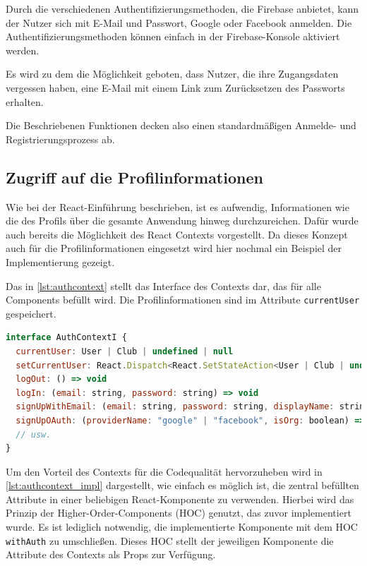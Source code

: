Durch die verschiedenen Authentifizierungsmethoden, die Firebase anbietet, kann der Nutzer sich mit E-Mail und Passwort, Google oder Facebook anmelden. Die Authentifizierungsmethoden können einfach in der Firebase-Konsole aktiviert werden.

Es wird zu dem die Möglichkeit geboten, dass Nutzer, die ihre Zugangsdaten vergessen haben, eine E-Mail mit einem Link zum Zurücksetzen des Passworts erhalten.

Die Beschriebenen Funktionen decken also einen standardmäßigen Anmelde- und Registrierungsprozess ab.

\subsection{Zugriff auf die Profilinformationen}
\label{sec:zugriff_profilinformationen}
Wie bei der React-Einführung beschrieben, ist es aufwendig, Informationen wie die des Profils über die gesamte Anwendung hinweg durchzureichen. Dafür wurde auch bereits die Möglichkeit des React Contexts vorgestellt. Da dieses Konzept auch für die Profilinformationen eingesetzt wird hier nochmal ein Beispiel der Implementierung gezeigt.

Das in \autoref{lst:authcontext} stellt das Interface des Contexts dar, das für alle Components befüllt wird. Die Profilinformationen sind im Attribute \texttt{currentUser} gespeichert.

\begin{lstlisting}[language=JavaScript, caption=Auszug aus dem Interface des Authentifizierungscontexts, label={lst:authcontext}]
interface AuthContextI {
  currentUser: User | Club | undefined | null
  setCurrentUser: React.Dispatch<React.SetStateAction<User | Club | undefined | null>>
  logOut: () => void
  logIn: (email: string, password: string) => void
  signUpWithEmail: (email: string, password: string, displayName: string, isOrg: boolean) => Promise<void>
  signUpOAuth: (providerName: "google" | "facebook", isOrg: boolean) => void
  // usw.
}
\end{lstlisting}

Um den Vorteil des Contexts für die Codequalität hervorzuheben wird in \autoref{lst:authcontext_impl} dargestellt, wie einfach es möglich ist, die zentral befüllten Attribute in einer beliebigen React-Komponente zu verwenden.
Hierbei wird das Prinzip der Higher-Order-Components (HOC) genutzt, das zuvor implementiert wurde. Es ist lediglich notwendig, die implementierte Komponente mit dem HOC \texttt{withAuth} zu umschließen. Dieses HOC stellt der jeweiligen Komponente die Attribute des Contexts als Props zur Verfügung.

